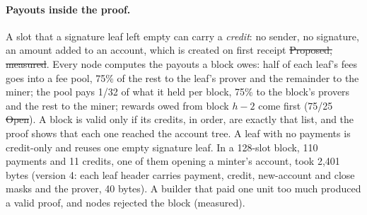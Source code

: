 \paragraph{Payouts inside the proof.} A slot that a signature leaf left empty can carry a \emph{credit}: no sender, no signature, an amount added to an account, which is created on first receipt \st{Proposed, measured}. Every node computes the payouts a block owes: half of each leaf's fees goes into a fee pool, 75\% of the rest to the leaf's prover and the remainder to the miner; the pool pays 1/32 of what it held per block, 75\% to the block's provers and the rest to the miner; rewards owed from block $h-2$ come first (75/25 \st{Open}). A block is valid only if its credits, in order, are exactly that list, and the proof shows that each one reached the account tree. A leaf with no payments is credit-only and reuses one empty signature leaf. In a 128-slot block, 110 payments and 11 credits, one of them opening a minter's account, took 2,401 bytes (version 4: each leaf header carries payment, credit, new-account and close masks and the prover, 40 bytes). A builder that paid one unit too much produced a valid proof, and nodes rejected the block (measured).


